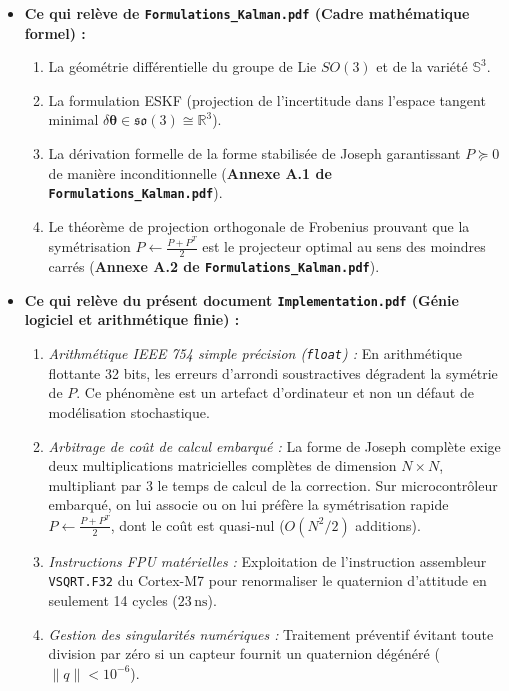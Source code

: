 \documentclass[../Implementation.tex]{subfiles}
\begin{document}
\begin{itemize}
    \item \textbf{Ce qui relève de \texttt{Formulations\_Kalman.pdf} (Cadre mathématique formel) :}
    \begin{enumerate}
        \item La géométrie différentielle du groupe de Lie $SO(3)$ et de la variété $\mathbb{S}^3$.
        \item La formulation ESKF (projection de l'incertitude dans l'espace tangent minimal $\delta\boldsymbol{\theta} \in \mathfrak{so}(3) \cong \mathbb{R}^3$).
        \item La dérivation formelle de la forme stabilisée de Joseph garantissant $P \succeq 0$ de manière inconditionnelle (\textbf{Annexe A.1 de \texttt{Formulations\_Kalman.pdf}}).
        \item Le théorème de projection orthogonale de Frobenius prouvant que la symétrisation $P \leftarrow \frac{P+P^T}{2}$ est le projecteur optimal au sens des moindres carrés (\textbf{Annexe A.2 de \texttt{Formulations\_Kalman.pdf}}).
    \end{enumerate}

    \item \textbf{Ce qui relève du présent document \texttt{Implementation.pdf} (Génie logiciel et arithmétique finie) :}
    \begin{enumerate}
        \item \textit{Arithmétique IEEE 754 simple précision (\lstinline|float|) :} En arithmétique flottante 32 bits, les erreurs d'arrondi soustractives dégradent la symétrie de $P$. Ce phénomène est un artefact d'ordinateur et non un défaut de modélisation stochastique.
        \item \textit{Arbitrage de coût de calcul embarqué :} La forme de Joseph complète exige deux multiplications matricielles complètes de dimension $N \times N$, multipliant par 3 le temps de calcul de la correction. Sur microcontrôleur embarqué, on lui associe ou on lui préfère la symétrisation rapide $P \leftarrow \frac{P+P^T}{2}$, dont le coût est quasi-nul ($O(N^2/2)$ additions).
        \item \textit{Instructions FPU matérielles :} Exploitation de l'instruction assembleur \lstinline|VSQRT.F32| du Cortex-M7 pour renormaliser le quaternion d'attitude en seulement 14 cycles ($23\,\text{ns}$).
        \item \textit{Gestion des singularités numériques :} Traitement préventif évitant toute division par zéro si un capteur fournit un quaternion dégénéré ($\|q\| < 10^{-6}$).
    \end{enumerate}
\end{itemize}
\end{document}
